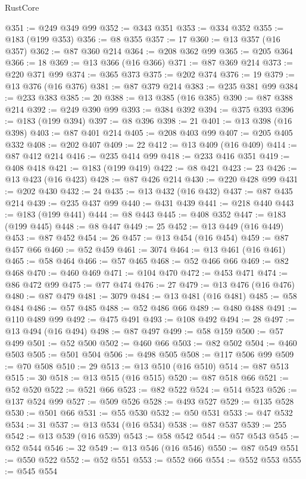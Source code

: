 \begin{lexlean}{RustCore}
\begin{coremodule}
@351 := @249 @349 @99
@352 := @343 @351
@353 := @334 @352
@355 := @183 (@199 @353)
@356 := @8 @355
@357 := 17
@360 := @13 @357 (@16 @357)
@362 := @87 @360 @214
@364 := @208 @362 @99
@365 := @205 @364
@366 := 18
@369 := @13 @366 (@16 @366)
@371 := @87 @369 @214
@373 := @220 @371 @99
@374 := @365 @373
@375 := @202 @374
@376 := 19
@379 := @13 @376 (@16 @376)
@381 := @87 @379 @214
@383 := @235 @381 @99
@384 := @233 @383
@385 := 20
@388 := @13 @385 (@16 @385)
@390 := @87 @388 @214
@392 := @249 @390 @99
@393 := @384 @392
@394 := @375 @393
@396 := @183 (@199 @394)
@397 := @8 @396
@398 := 21
@401 := @13 @398 (@16 @398)
@403 := @87 @401 @214
@405 := @208 @403 @99
@407 := @205 @405 @332
@408 := @202 @407
@409 := 22
@412 := @13 @409 (@16 @409)
@414 := @87 @412 @214
@416 := @235 @414 @99
@418 := @233 @416 @351
@419 := @408 @418
@421 := @183 (@199 @419)
@422 := @8 @421
@423 := 23
@426 := @13 @423 (@16 @423)
@428 := @87 @426 @214
@430 := @220 @428 @99
@431 := @202 @430
@432 := 24
@435 := @13 @432 (@16 @432)
@437 := @87 @435 @214
@439 := @235 @437 @99
@440 := @431 @439
@441 := @218 @440
@443 := @183 (@199 @441)
@444 := @8 @443
@445 := @408 @352
@447 := @183 (@199 @445)
@448 := @8 @447
@449 := 25
@452 := @13 @449 (@16 @449)
@453 := @87 @452
@454 := 26
@457 := @13 @454 (@16 @454)
@459 := @87 @457 @66
@460 := @52 @459
@461 := 3074
@464 := @13 @461 (@16 @461)
@465 := @58 @464
@466 := @57 @465
@468 := @52 @466 @66
@469 := @82 @468
@470 := @460 @469
@471 := @104 @470
@472 := @453 @471
@474 := @86 @472 @99
@475 := @77 @474
@476 := 27
@479 := @13 @476 (@16 @476)
@480 := @87 @479
@481 := 3079
@484 := @13 @481 (@16 @481)
@485 := @58 @484
@486 := @57 @485
@488 := @52 @486 @66
@489 := @480 @488
@491 := @110 @489 @99
@492 := @475 @491
@493 := @108 @492
@494 := 28
@497 := @13 @494 (@16 @494)
@498 := @87 @497
@499 := @58 @159
@500 := @57 @499
@501 := @52 @500
@502 := @460 @66
@503 := @82 @502
@504 := @460 @503
@505 := @501 @504
@506 := @498 @505
@508 := @117 @506 @99
@509 := @70 @508
@510 := 29
@513 := @13 @510 (@16 @510)
@514 := @87 @513
@515 := 30
@518 := @13 @515 (@16 @515)
@520 := @87 @518 @66
@521 := @52 @520
@522 := @521 @66
@523 := @82 @522
@524 := @514 @523
@526 := @137 @524 @99
@527 := @509 @526
@528 := @493 @527
@529 := @135 @528
@530 := @501 @66
@531 := @55 @530
@532 := @50 @531
@533 := @47 @532
@534 := 31
@537 := @13 @534 (@16 @534)
@538 := @87 @537
@539 := 255
@542 := @13 @539 (@16 @539)
@543 := @58 @542
@544 := @57 @543
@545 := @52 @544
@546 := 32
@549 := @13 @546 (@16 @546)
@550 := @87 @549
@551 := @550 @522
@552 := @52 @551
@553 := @552 @66
@554 := @552 @553
@555 := @545 @554

\end{coremodule}
\end{lexlean}
